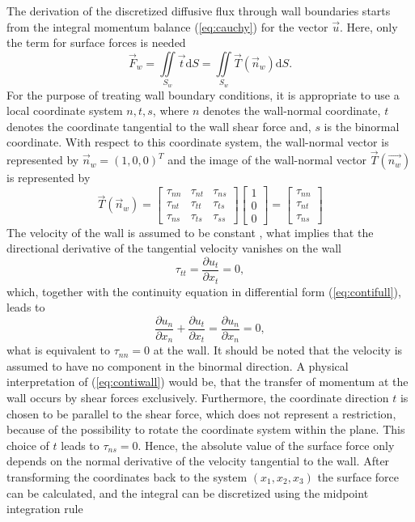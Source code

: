 The derivation of the discretized diffusive flux through wall boundaries starts from the integral momentum balance (\ref{eq:cauchy}) for the vector \(\vec{u}\). Here, only the term for surface forces is needed
\begin{displaymath}
  \vec{F}_w =  \iint\limits_{S_w} \vec{t} \mathrm{d}S = \iint\limits_{S_w} \vec{T}(\vec{n}_w) \mathrm{d}S.
\end{displaymath}
For the purpose of treating wall boundary conditions, it is appropriate to use a local coordinate system \(n,t,s\), where \(n\) denotes the wall-normal coordinate, \(t\) denotes the coordinate tangential to the wall shear force and, \(s\) is the binormal coordinate. With respect to this coordinate system, the wall-normal vector is represented by \(\vec{n}_w = \left( 1, 0 , 0 \right)^T\) and the image of the wall-normal vector \(\vec{T}(\vec{n_w})\) is represented by 
\begin{displaymath}
\vec{T}(\vec{n}_w) =
\left[
  \begin{array}{ccc}
    \tau_{nn} & \tau_{nt} & \tau_{ns}\\
    \tau_{nt} & \tau_{tt} & \tau_{ts}\\
    \tau_{ns} & \tau_{ts} & \tau_{ss}
  \end{array}
\right]
\left[
\begin{array}{c}
  1\\
  0\\
  0
\end{array}
\right]
=
\left[
\begin{array}{c}
  \tau_{nn}\\
  \tau_{nt}\\
  \tau_{ns}
\end{array}
\right]
\end{displaymath}
The velocity of the wall is assumed to be constant \cite{schaefer99}, what implies that the directional derivative of the tangential velocity vanishes on the wall
\begin{displaymath}
  \tau_{tt} =  \frac{ \partial u_t }{ \partial x_t }  =  0,
\end{displaymath}
which, together with the continuity equation in differential form (\ref{eq:contifull}), leads to
\begin{equation}
  \label{eq:contiwall}
 \frac{ \partial u_n }{ \partial x_n } + \frac{ \partial u_t }{ \partial x_t } =  \frac{ \partial u_n }{ \partial x_n } = 0,
\end{equation}
what is equivalent to \( \tau_{nn} = 0\) at the wall. It should be noted that the velocity is assumed to have no component in the binormal direction. A physical interpretation of (\ref{eq:contiwall}) would be, that the transfer of momentum at the wall occurs by shear forces exclusively. Furthermore, the coordinate direction \(t\) is chosen to be parallel to the shear force, which does not represent a restriction, because of the possibility to rotate the coordinate system within the plane. This choice of \(t\) leads to \( \tau_{ns} = 0 \). Hence, the absolute value of the surface force only depends on the normal derivative of the velocity tangential to the wall. After transforming the coordinates back to the system \((x_1, x_2, x_3)\) the surface force can be calculated, and the integral can be discretized using the midpoint integration rule 
